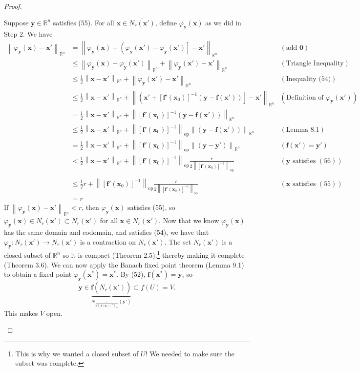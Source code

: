 \documentclass{article}
\newcommand{\R}{\mathbb{R}}
\newcommand{\x}{\mathbf{x}}
\newcommand{\f}{\mathbf{f}}
\newcommand{\y}{\mathbf{y}}
\newcommand{\ze}{\mathbf{0}}
\newcommand{\norm}[1]{\left\lVert#1\right\rVert}
\newcommand{\normop}[1]{\left\lVert#1\right\rVert_\text{op}}
\theoremstyle{definition}
\begin{document}
\begin{proof}
\begin{enumerate}
			
			Suppose $ \y\in \R^n $ satisfies (55). For all $ \x\in\overline{N_r(\x')}  $, define $ \varphi_{\y}(\x) $ as we did in Step 2. We have 
			\begin{align*}
				\norm{\varphi_{\y}(\x) - \x'}_{\R^n}& =	\norm{\varphi_{\y}(\x) + \left(\varphi_{\y}(\x') -\varphi_{\y}(\x') \right]  - \x'}_{\R^n} & (\text{add }\ze)\\ 
				& \le \norm{\varphi_{\y}(\x) - \varphi_{\y}(\x')}_{\R^n}  + \norm{\varphi_{\y}(\x')  - \x'}_{\R^n} & (\text{Triangle Inequality})\\ & 
				\le \frac{1}{2}\norm{\x-\x'}_{\R^n} + \norm{\varphi_\y(\x')  - \x'}_{\R^n} & (\text{Inequality (54)})\\
				& 
				\le \frac{1}{2}\norm{\x-\x'}_{\R^n} + \norm{\left(\x' + [\f'(\x_0)]^{-1}(\y - \f(\x'))\right] - \x'}_{\R^n} & (\text{Definition of }\varphi_{\y}(\x')) \\ & = 	 \frac{1}{2}\norm{\x-\x'}_{\R^n} + \norm{ [\f'(\x_0)]^{-1}(\y - \f(\x'))}_{\R^n} \\ &\le  \frac{1}{2}\norm{\x-\x'}_{\R^n} + \normop{[\f'(\x_0)]^{-1}}\norm{(\y - \f(\x'))}_{\R^n} & (\text{Lemma 8.1}) \\
				&=  \frac{1}{2}\norm{\x-\x'}_{\R^n} + \normop{[\f'(\x_0)]^{-1}}\norm{(\y - \y')}_{\R^n} & (\f(\x')=\y') \\
				& < \frac{1}{2}\norm{\x-\x'}_{\R^n} + \normop{[\f'(\x_0)]^{-1}}\frac{r}{2\normop{[\f'(\x_0)]^{-1}}} & (\y\text{ satisfies }(56))\\ \\
				& \le \frac{1}{2}r+ \normop{[\f'(\x_0)]^{-1}}\frac{r}{2\normop{[\f'(\x_0)]^{-1}}} & (\x\text{ satisfies }(55))\\ & = r
			\end{align*}
			If $ \norm{\varphi_{\y}(\x) - \x'}_{\R^n} <r$, then $ \varphi_{\y}(\x)  $ satisfies (55), so $ \varphi_{\y}(\x)\in N_r(\x') \subset \overline{N_r(\x')}   $ for all $ \x\in\overline{N_r(\x')} $. Now that we know $ \varphi_\y(\x) $ has the same domain and codomain, and satisfies (54), we have that $ \varphi_{\y}:\overline{N_r(\x')} \to \overline{N_r(\x')}  $ is a contraction on $ \overline{N_r(\x')}  $. The set $ \overline{N_r(\x')} $ is a closed subset of $ \R^n $ so it is compact (Theorem 2.5),\footnote{This is why we wanted a closed subset of $U$! We needed to make sure the subset was complete.} thereby making it complete (Theorem 3.6). We can now apply the Banach fixed point theorem (Lemma 9.1) to obtain a fixed point $ \varphi_\y(\x^*)=\x^* $. By (52), $ \f(\x^*)=\y $, so $$ \y\in \underbrace{\f\left(\overline{N_r(\x')}\right) }_{N_{\frac{r}{2\normop{[\f'(\x_0)]^{-1}}}}(\y')}\subset f(U)=V .$$ This makes $ V $ open.

\end{enumerate}
\end{proof}
\end{document}
